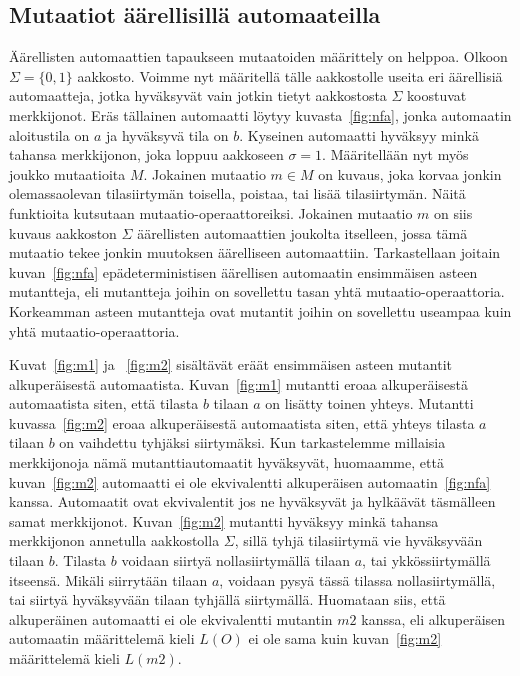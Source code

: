 \documentclass[finnish]{tktltiki2}
\begin{document}
\subsection{Mutaatiot äärellisillä automaateilla}
Äärellisten automaattien tapaukseen mutaatoiden määrittely on helppoa. Olkoon $\Sigma=\{0,1\}$ aakkosto. Voimme nyt määritellä tälle aakkostolle useita eri äärellisiä automaatteja, jotka hyväksyvät vain jotkin tietyt aakkostosta $\Sigma$ koostuvat merkkijonot. Eräs tällainen automaatti löytyy kuvasta~\ref{fig:nfa}, jonka automaatin aloitustila on $a$ ja hyväksyvä tila on $b$. Kyseinen automaatti hyväksyy minkä tahansa merkkijonon, joka loppuu aakkoseen $\sigma = 1$. Määritellään nyt myös joukko mutaatioita $M$. Jokainen mutaatio $m\in M$ on kuvaus, joka korvaa jonkin olemassaolevan tilasiirtymän toisella, poistaa, tai lisää tilasiirtymän. Näitä funktioita kutsutaan mutaatio-operaattoreiksi. Jokainen mutaatio $m$ on siis kuvaus aakkoston $\Sigma$ äärellisten automaattien joukolta itselleen, jossa tämä mutaatio tekee jonkin muutoksen äärelliseen automaattiin. Tarkastellaan joitain kuvan~\ref{fig:nfa} epädeterministisen äärellisen automaatin ensimmäisen asteen mutantteja, eli mutantteja joihin on sovellettu tasan yhtä mutaatio-operaattoria. Korkeamman asteen mutantteja ovat mutantit joihin on sovellettu useampaa kuin yhtä mutaatio-operaattoria.

Kuvat~\ref{fig:m1} ja ~\ref{fig:m2} sisältävät eräät ensimmäisen asteen mutantit alkuperäisestä automaatista. Kuvan~\ref{fig:m1} mutantti eroaa alkuperäisestä automaatista siten, että tilasta $b$ tilaan $a$ on lisätty toinen yhteys. Mutantti kuvassa~\ref{fig:m2} eroaa alkuperäisestä automaatista siten, että yhteys tilasta $a$ tilaan $b$ on vaihdettu tyhjäksi siirtymäksi. Kun tarkastelemme millaisia merkkijonoja nämä mutanttiautomaatit hyväksyvät, huomaamme, että kuvan~\ref{fig:m2} automaatti ei ole ekvivalentti alkuperäisen automaatin~\ref{fig:nfa} kanssa. Automaatit ovat ekvivalentit jos ne hyväksyvät ja hylkäävät täsmälleen samat merkkijonot. Kuvan~\ref{fig:m2} mutantti hyväksyy minkä tahansa merkkijonon annetulla aakkostolla $\Sigma$, sillä tyhjä tilasiirtymä vie hyväksyvään tilaan $b$. Tilasta $b$ voidaan siirtyä nollasiirtymällä tilaan $a$, tai ykkössiirtymällä itseensä. Mikäli siirrytään tilaan $a$, voidaan pysyä tässä tilassa nollasiirtymällä, tai siirtyä hyväksyvään tilaan tyhjällä siirtymällä. Huomataan siis, että alkuperäinen automaatti ei ole ekvivalentti mutantin $m2$ kanssa, eli alkuperäisen automaatin määrittelemä kieli $L(O)$ ei ole sama kuin kuvan~\ref{fig:m2} määrittelemä kieli $L(m2)$.
\end{document}
